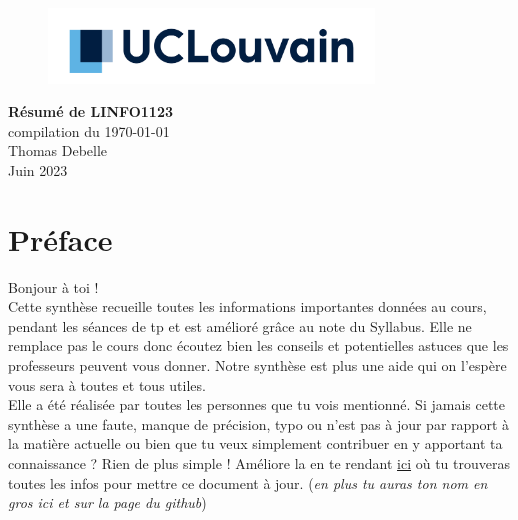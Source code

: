 \documentclass{report}
\begin{document}
\begin{titlepage}
    \begin{figure}
        \includegraphics[height = 2cm]{UCL_Logo.png}
        \label{fig:my_label}
    \end{figure}

    \hspace*{100cm}
    \centering
    \vspace*{7cm}

    {\Huge \textbf{Résumé de LINFO1123}}\\
    \vspace*{0.25cm}
    compilation du \today\\
    \vspace*{0.25cm}
    \Large{Thomas Debelle}\\

    \vspace*{9.5cm} %
    {\Large Juin 2023}
\end{titlepage}

\setcounter{tocdepth}{1}
\tableofcontents
\newpage

\section*{Préface}

Bonjour à toi !\\

Cette synthèse recueille toutes les informations importantes données au cours, pendant les séances de tp et est amélioré grâce au note du Syllabus. Elle ne remplace pas le cours donc écoutez bien les conseils et potentielles astuces que les professeurs peuvent vous donner. Notre synthèse est plus une aide qui on l'espère vous sera à toutes et tous utiles.\\

Elle a été réalisée par toutes les personnes que tu vois mentionné. Si jamais cette synthèse a une faute, manque de précision, typo ou n'est pas à jour par rapport à la matière actuelle ou bien que tu veux simplement contribuer en y apportant ta connaissance ? Rien de plus simple ! Améliore la en te rendant \href{http://www.github.com/Tfloow/Q4_EPL}{ici} où tu trouveras toutes les infos pour mettre ce document à jour. (\textit{en plus tu auras ton nom en gros ici et sur la page du github})\\
\end{document}
